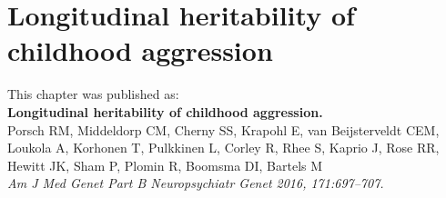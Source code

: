 \documentclass[header.tex]{subfiles}
\begin{document}
\chapter[Hertability of Aggression]{Longitudinal heritability of childhood aggression}
\label{cha:longHera}
This chapter was published as: \\
\textbf{Longitudinal heritability of childhood aggression.} \\
Porsch RM, Middeldorp CM, Cherny SS, Krapohl E, van Beijsterveldt CEM, Loukola A, Korhonen T, Pulkkinen L, Corley R, Rhee S, Kaprio J, Rose RR, Hewitt JK, Sham P, Plomin R, Boomsma DI, Bartels M \\
\textit{Am J Med Genet Part B Neuropsychiatr Genet 2016, 171:697–707.}





\newpage
\printbibliography[heading=subbibliography]
\end{document}
